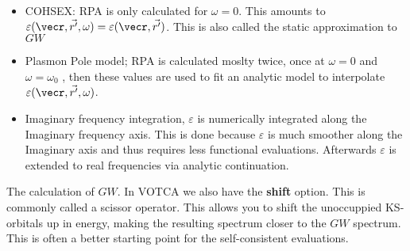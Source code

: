 \begin{itemize}
 \item COHSEX: RPA is only calculated for $\omega=0$. This amounts to $\varepsilon(\vecr,\vec{r'},\omega)=\varepsilon(\vecr,\vec{r'})$. This is also called the static approximation to $GW$
 \item Plasmon Pole model; RPA is calculated moslty twice, once at $\omega=0$ and $\omega=\omega_0$ , then these values are used to fit an analytic model to interpolate $\varepsilon(\vecr,\vec{r'},\omega)$.
 \item Imaginary frequency integration, $\varepsilon$ is numerically integrated along the Imaginary frequency axis. This is done because $\varepsilon$ is much smoother along the Imaginary axis and thus requires less functional evaluations. Afterwards $\varepsilon$ is extended to real frequencies via analytic continuation.  
\end{itemize}

The calculation of $GW$. In VOTCA we also have the \textbf{shift} option. This is commonly called a scissor operator. This allows you to shift the unoccuppied KS-orbitals up in energy, making the resulting spectrum closer to the $GW$ spectrum. This is often a better starting point for the self-consistent evaluations.

